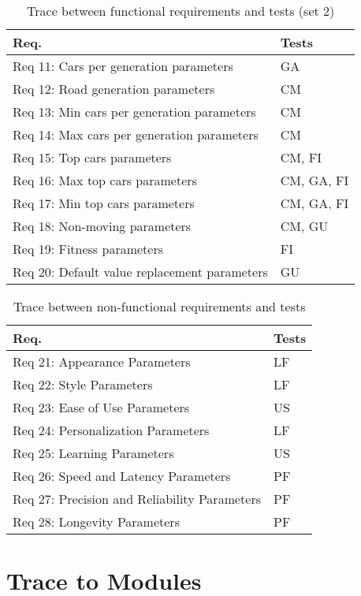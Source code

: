 \documentclass[12pt, titlepage]{article}
\begin{document}
\begin{table}[H]
\centering
\begin{tabular}{p{} p{}}
\toprule
\textbf{Req.} & \textbf{Tests}\\
\midrule
Req 11: Cars per generation parameters  & GA\\
Req 12: Road generation parameters & CM\\
Req 13: Min cars per generation parameters & CM\\
Req 14: Max cars per generation parameters & CM\\
Req 15: Top cars parameters & CM, FI\\
Req 16: Max top cars parameters & CM, GA, FI\\
Req 17: Min top cars parameters & CM, GA, FI\\
Req 18: Non-moving parameters & CM, GU\\
Req 19: Fitness parameters & FI\\
Req 20: Default value replacement parameters & GU\\
\bottomrule
\end{tabular}
\caption{Trace between functional requirements and tests (set 2)}
\label{TblRT2}
\end{table}

\begin{table}[H]
\centering
\begin{tabular}{p{} p{}}
\toprule
\textbf{Req.} & \textbf{Tests}\\
\midrule
Req 21: Appearance Parameters & LF\\
Req 22: Style Parameters & LF\\
Req 23: Ease of Use Parameters & US\\
Req 24: Personalization Parameters & LF\\
Req 25: Learning Parameters & US\\
Req 26: Speed and Latency Parameters & PF\\
Req 27: Precision and Reliability Parameters & PF\\
Req 28: Longevity Parameters & PF\\
\bottomrule
\end{tabular}
\caption{Trace between non-functional requirements and tests}
\label{TblRT2}
\end{table}

\section{Trace to Modules}	
\end{document}
